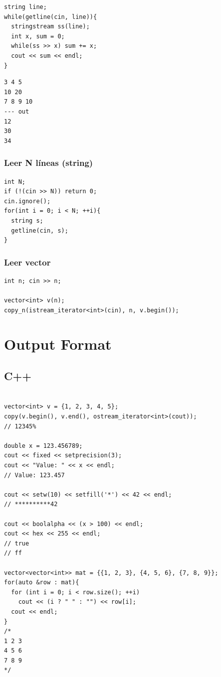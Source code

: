 \documentclass{article}
\begin{document}
\begin{lstlisting}[style=cppstyle]
string line;
while(getline(cin, line)){
  stringstream ss(line);
  int x, sum = 0;
  while(ss >> x) sum += x;
  cout << sum << endl;
}
\end{lstlisting}

\begin{lstlisting}
3 4 5
10 20
7 8 9 10
--- out
12
30
34

\end{lstlisting}

\subsubsection{Leer N líneas (string)}

\begin{lstlisting}[style=cppstyle]
int N;
if (!(cin >> N)) return 0;
cin.ignore();
for(int i = 0; i < N; ++i){
  string s;
  getline(cin, s);
}
\end{lstlisting}


\subsubsection{Leer vector}

\begin{lstlisting}[style=cppstyle]
int n; cin >> n;

vector<int> v(n);
copy_n(istream_iterator<int>(cin), n, v.begin());

\end{lstlisting}





\section{Output Format}


\subsection{C++}

\begin{lstlisting}[style=cppstyle]

vector<int> v = {1, 2, 3, 4, 5};
copy(v.begin(), v.end(), ostream_iterator<int>(cout));
// 12345%

double x = 123.456789;
cout << fixed << setprecision(3);
cout << "Value: " << x << endl;
// Value: 123.457

cout << setw(10) << setfill('*') << 42 << endl;
// **********42

cout << boolalpha << (x > 100) << endl;
cout << hex << 255 << endl;
// true
// ff

vector<vector<int>> mat = {{1, 2, 3}, {4, 5, 6}, {7, 8, 9}};
for(auto &row : mat){
  for (int i = 0; i < row.size(); ++i)
    cout << (i ? " " : "") << row[i];
  cout << endl;
}
/*
1 2 3
4 5 6
7 8 9
*/
\end{lstlisting}
\end{document}
